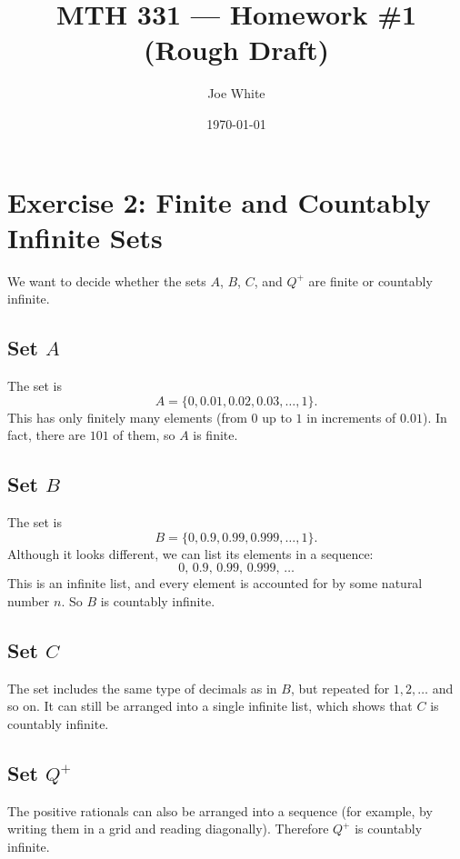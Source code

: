 \documentclass[11pt]{article}
\title{MTH 331 — Homework \#1 (Rough Draft)}
\author{Joe White}
\date{\today}
\begin{document}
\maketitle

\section*{Exercise 2: Finite and Countably Infinite Sets}

We want to decide whether the sets $A$, $B$, $C$, and $Q^+$ are finite or countably infinite.

\subsection*{Set $A$}
The set is 
\[
A = \{0, 0.01, 0.02, 0.03, \dots, 1\}.
\]
This has only finitely many elements (from $0$ up to $1$ in increments of $0.01$). In fact, there are $101$ of them, so $A$ is finite.

\subsection*{Set $B$}
The set is
\[
B = \{0, 0.9, 0.99, 0.999, \dots, 1\}.
\]
Although it looks different, we can list its elements in a sequence:
\[
0,\,0.9,\,0.99,\,0.999,\,\dots
\]
This is an infinite list, and every element is accounted for by some natural number $n$. So $B$ is countably infinite.

\subsection*{Set $C$}
The set includes the same type of decimals as in $B$, but repeated for $1, 2, \dots$ and so on.
It can still be arranged into a single infinite list, which shows that $C$ is countably infinite.

\subsection*{Set $Q^+$}
The positive rationals can also be arranged into a sequence (for example, by writing them in a grid and reading diagonally). Therefore $Q^+$ is countably infinite.
\end{document}
